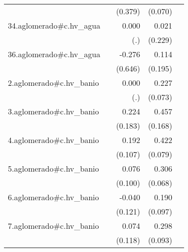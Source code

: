 {\begin{longtable}{l*{4}{D{.}{.}{-1}}}
            &                     &     (0.379)         &     (0.070)         &                     \\
\addlinespace
34.aglomerado#c.hv\_agua&                     &       0.000         &       0.021         &                     \\
            &                     &         (.)         &     (0.229)         &                     \\
\addlinespace
36.aglomerado#c.hv\_agua&                     &      -0.276         &       0.114         &                     \\
            &                     &     (0.646)         &     (0.195)         &                     \\
\addlinespace
2.aglomerado#c.hv\_banio&                     &       0.000         &       0.227\sym{**} &                     \\
            &                     &         (.)         &     (0.073)         &                     \\
\addlinespace
3.aglomerado#c.hv\_banio&                     &       0.224         &       0.457\sym{**} &                     \\
            &                     &     (0.183)         &     (0.168)         &                     \\
\addlinespace
4.aglomerado#c.hv\_banio&                     &       0.192         &       0.422\sym{***}&                     \\
            &                     &     (0.107)         &     (0.079)         &                     \\
\addlinespace
5.aglomerado#c.hv\_banio&                     &       0.076         &       0.306\sym{***}&                     \\
            &                     &     (0.100)         &     (0.068)         &                     \\
\addlinespace
6.aglomerado#c.hv\_banio&                     &      -0.040         &       0.190         &                     \\
            &                     &     (0.121)         &     (0.097)         &                     \\
\addlinespace
7.aglomerado#c.hv\_banio&                     &       0.074         &       0.298\sym{**} &                     \\
            &                     &     (0.118)         &     (0.093)         &                     \\

\end{longtable}}
